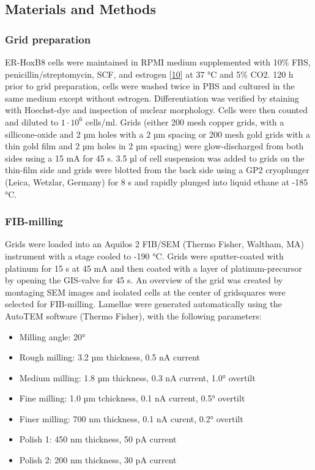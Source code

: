 \documentclass[
]{article}
\providecommand{\tightlist}{%
  \setlength{\itemsep}{0pt}\setlength{\parskip}{0pt}}
\begin{document}
\hypertarget{materials-and-methods}{%
\subsection{Materials and Methods}\label{materials-and-methods}}

\hypertarget{grid-preparation}{%
\subsubsection{Grid preparation}\label{grid-preparation}}

ER-HoxB8 cells were maintained in RPMI medium supplemented with 10\% FBS,
penicillin/streptomycin, SCF, and estrogen {[}\protect\hyperlink{ref-1B9Vt9eYu}{10}{]} at
37 °C and 5\% CO2. 120 h prior to grid preparation, cells were washed twice in PBS
and cultured in the same medium except without estrogen. Differentiation was
verified by staining with Hoechst-dye and inspection of nuclear morphology.
Cells were then counted and diluted to \(1\cdot10^6\) cells/ml. Grids (either 200
mesh copper grids, with a sillicone-oxide and 2 µm holes with a 2 µm spacing or
200 mesh gold grids with a thin gold film and 2 µm holes in 2 µm spacing) were
glow-discharged from both sides using a 15 mA for 45 s. 3.5 µl of cell suspension
was added to grids on the thin-film side and grids were blotted from the back
side using a GP2 cryoplunger (Leica, Wetzlar, Germany) for 8 s and rapidly plunged into liquid
ethane at -185 °C.

\hypertarget{fib-milling}{%
\subsubsection{FIB-milling}\label{fib-milling}}

Grids were loaded into an Aquilos 2 FIB/SEM (Thermo Fisher, Waltham, MA) instrument with a
stage cooled to -190 °C. Grids were sputter-coated with platinum for 15 s at 45 mA
and then coated with a layer of platinum-precursor by opening the GIS-valve for
45 s. An overview of the grid was created by montaging SEM images and isolated
cells at the center of gridsquares were selected for FIB-milling. Lamellae were
generated automatically using the AutoTEM software (Thermo Fisher), with the
following parameters:

\begin{itemize}
\tightlist
\item
  Milling angle: 20°
\item
  Rough milling: 3.2 µm thickness, 0.5 nA current
\item
  Medium milling: 1.8 µm thickness, 0.3 nA current, 1.0° overtilt
\item
  Fine milling: 1.0 µm tchickness, 0.1 nA current, 0.5° overtilt
\item
  Finer milling: 700 nm thickness, 0.1 nA curent, 0.2° overtilt
\item
  Polish 1: 450 nm thickness, 50 pA current
\item
  Polish 2: 200 nm thickness, 30 pA current
\end{itemize}
\end{document}
